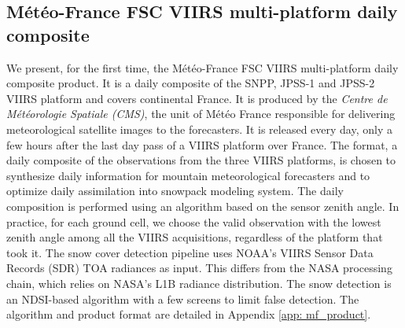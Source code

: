 \documentclass[tc, manuscript]{copernicus}
\begin{document}
\subsection{Météo-France FSC VIIRS multi-platform daily composite}
\label{subsec: data_meteofrance}
We present, for the first time, the Météo-France FSC VIIRS multi-platform daily composite product. It is a daily composite of the SNPP, JPSS-1 and JPSS-2 VIIRS platform and covers continental France. It is produced by the
\textit{Centre de Météorologie Spatiale (CMS)}, the unit of Météo France responsible for delivering meteorological satellite images to the forecasters. It is released every day, only a few hours after the last day pass of a VIIRS platform over France. The format, a daily composite of the observations from the three VIIRS platforms, is chosen to synthesize daily information for mountain meteorological forecasters and to optimize daily assimilation into snowpack modeling system. The daily composition is performed using an algorithm based on the sensor zenith angle. In practice, for each ground cell, we choose the valid observation with the lowest zenith angle among all the VIIRS acquisitions, regardless of the platform that took it. The snow cover detection pipeline uses NOAA's VIIRS Sensor Data Records (SDR) TOA radiances as input. This differs from the NASA processing chain, which relies on NASA's L1B radiance distribution. The snow detection is an NDSI-based algorithm with a few screens to limit false detection. The algorithm and product format are detailed in Appendix \ref{app: mf_product}. 
\end{document}
